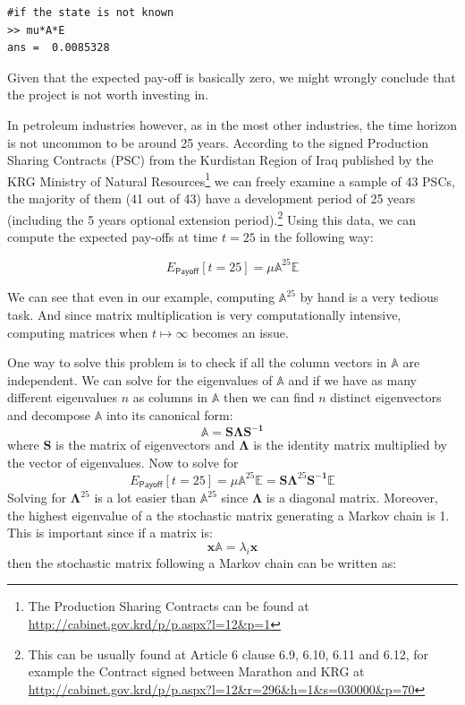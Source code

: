\documentclass[a4paper,12pt]{article}
\theoremstyle{definition}
\begin{document}
\begin{lstlisting}
#if the state is not known
>> mu*A*E
ans =  0.0085328
\end{lstlisting}

Given that the expected pay-off is basically zero, we might wrongly conclude that the project is not worth investing in. 

In petroleum industries however, as in the most other industries, the time horizon is not uncommon to be around 25 years. According to the signed Production Sharing Contracts (PSC) from the Kurdistan Region of Iraq published by the KRG Ministry of Natural Resources\footnote{The Production Sharing Contracts can be found at \href{http://cabinet.gov.krd/p/p.aspx?l=12\&p=1}{http://cabinet.gov.krd/p/p.aspx?l=12\&p=1}} we can freely examine a sample of 43 PSCs, the majority of them (41 out of 43) have a development period of 25 years (including the 5 years optional extension period).\footnote{This can be usually found at Article 6 clause 6.9, 6.10, 6.11 and 6.12, for example the Contract signed between Marathon and KRG at \href{http://cabinet.gov.krd/p/p.aspx?l=12\&r=296\&h=1\&s=030000\&p=70}{http://cabinet.gov.krd/p/p.aspx?l=12\&r=296\&h=1\&s=030000\&p=70} } Using this data, we can compute the expected pay-offs at time $t=25$ in the following way:

\begin{equation}
E_{\textsf{Payoff}}[t=25] = \mu \mathbb{A}^{25} \mathbb{E}
\end{equation}

We can see that even in our example, computing $\mathbb{A}^{25}$ by hand is a very tedious task. And since matrix multiplication is very computationally intensive, computing matrices when $t \mapsto \infty$ becomes an issue. 

One way to solve this problem is to check if all the column vectors in $\mathbb{A}$ are independent. We can solve for the eigenvalues of $\mathbb{A}$ and if we have as many different eigenvalues $n$ as columns in $\mathbb{A}$ then we can find $n$ distinct eigenvectors
and decompose $\mathbb{A}$ into its canonical form: 
\begin{equation}\label{eq:canonical}
\mathbb{A} = \mathbf{S} \mathbf{\Lambda} \mathbf{S^{-1}}
\end{equation}
where $\mathbf{S}$ is the matrix of eigenvectors and $\mathbf{\Lambda}$ is the identity matrix multiplied by the vector of eigenvalues. 
Now to solve for 
\begin{equation}
E_{\textsf{Payoff}}[t=25] = \mu \mathbb{A}^{25} \mathbb{E} =  \mathbf{S} \mathbf{\Lambda}^{25} \mathbf{S^{-1}}\mathbb{E}
\end{equation}
Solving for $\mathbf{\Lambda}^{25}$ is a lot easier than $\mathbb{A}^{25}$ since $\mathbf{\Lambda}$ is a diagonal matrix. Moreover, the highest eigenvalue of a the stochastic matrix generating a Markov chain is 1. This is important since if a matrix is:
\begin{equation}
\mathbf{x}\mathbb{A} = \lambda_i \mathbf{x}
\end{equation}
then the stochastic matrix following a Markov chain can be written as:
\end{document}
